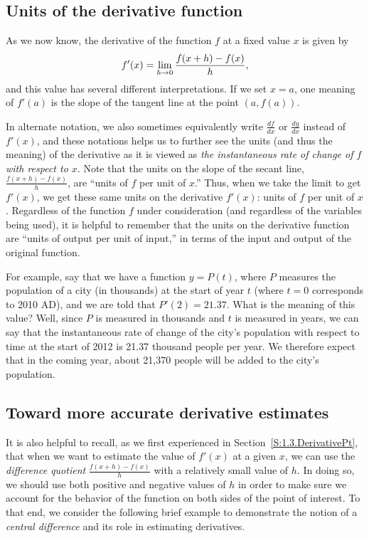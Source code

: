 

\subsection*{Units of the derivative function}

As we now know, the derivative of the function $f$ at a fixed value $x$ is given by
$$f'(x) = \displaystyle \lim_{h \to 0} \frac{f(x+h)-f(x)}{h},$$  and this value has several different interpretations.  If we set $x = a$, one meaning of $f'(a)$ is  the slope of the tangent line at the point $(a,f(a))$.

In alternate notation, we also sometimes equivalently write $\frac{df}{dx}$ or $\frac{dy}{dx}$ instead of $f'(x)$, and these notations helps us to further see the units (and thus the meaning) of the derivative as it is viewed as \emph{the instantaneous rate of change of $f$ with respect to $x$}.  Note that the units on the slope of the secant line, $\frac{f(x+h)-f(x)}{h}$, are ``units of $f$ per unit of $x$.''  Thus, when we take the limit to get $f'(x)$, we get these same units on the derivative $f'(x)$:  units of $f$ per unit of $x$.  Regardless of the function $f$ under consideration (and regardless of the variables being used), it is helpful to remember that the units on the derivative function are ``units of output per unit of input,'' in terms of the input and output of the original function.

For example, say that we have a function $y = P(t)$, where $P$ measures the population of a city (in thousands) at the start of year $t$ (where $t = 0$ corresponds to 2010 AD), and we are told that $P'(2) = 21.37$.  What is the meaning of this value?  Well, since $P$ is measured in thousands and $t$ is measured in years, we can say that the instantaneous rate of change of the city's population with respect to time at the start of 2012 is 21.37 thousand people per year.  We therefore expect that in the coming year, about 21,370 people will be added to the city's population.

\subsection*{Toward more accurate derivative estimates}

It is also helpful to recall, as we first experienced in Section~\ref{S:1.3.DerivativePt}, that when we want to estimate the value of $f'(x)$ at a given $x$, we can use the \emph{difference quotient}  $\frac{f(x+h)-f(x)}{h}$ with a relatively small value of $h$.  In doing so, we should use both positive and negative values of $h$ in order to make sure we account for the behavior of the function on both sides of the point of interest.  To that end, we consider the following brief example to demonstrate the notion of a \emph{central difference} and its role in estimating derivatives.

